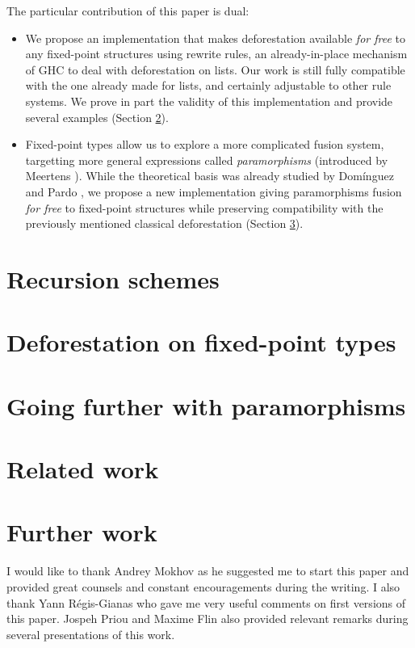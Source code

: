 \documentclass[format=sigplan, review=true, anonymous=true]{acmart}
\begin{document}
The particular contribution of this paper is dual:
\begin{itemize}
\item We propose an implementation that makes deforestation available \emph{for free} to any fixed-point structures using rewrite rules, an already-in-place mechanism of GHC to deal with deforestation on lists. Our work is still fully compatible with the one already made for lists, and certainly adjustable to other rule systems. We prove in part the validity of this implementation and provide several examples (Section \ref{sec:rectypes}).
\item Fixed-point types allow us to explore a more complicated fusion system, targetting more general expressions called \emph{paramorphisms} (introduced by Meertens \cite{Meertens1992}). While the theoretical basis was already studied by Domínguez and Pardo \cite{paramorphismFusion}, we propose a new implementation giving paramorphisms fusion \emph{for free} to fixed-point structures while preserving compatibility with the previously mentioned classical deforestation (Section \ref{sec:para}).
\end{itemize}

\section{Recursion schemes}
\label{sec:recschemes}


\section{Deforestation on fixed-point types}
\label{sec:rectypes}


\section{Going further with paramorphisms}
\label{sec:para}


\section{Related work}
\label{sec:related}


\section{Further work}
\label{sec:further}


\begin{acks}
I would like to thank Andrey Mokhov as he suggested me to start this paper and provided great counsels and constant encouragements during the writing. I also thank Yann Régis-Gianas who gave me very useful comments on first versions of this paper. Jospeh Priou and Maxime Flin also provided relevant remarks during several presentations of this work.
\end{acks}



\end{document}
